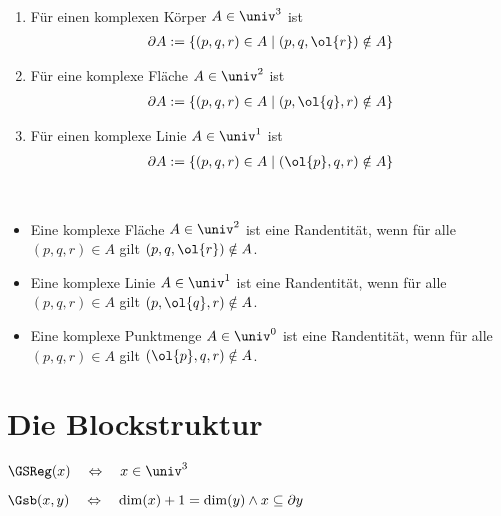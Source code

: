 \begin{dfn}\ 
    \begin{enumerate}
        \item Für einen komplexen Körper $A \in \univ^3$ ist
            \begin{align*}
                \partial A := \{(p,q,r) \in A \mid (p,q,\ol{r}) \notin A\}
            \end{align*}
        \item Für eine komplexe Fläche $A \in \univ^2$ ist
            \begin{align*}
                \partial A := \{(p,q,r) \in A \mid (p,\ol{q},r) \notin A\}
            \end{align*}
        \item Für einen komplexe Linie $A \in \univ^1$ ist
            \begin{align*}
                \partial A := \{(p,q,r) \in A \mid (\ol{p},q,r) \notin A\}
            \end{align*}
    \end{enumerate}
\end{dfn}

\begin{dfn}[Randentität]\ 
    \begin{itemize}
        \item Eine komplexe Fläche $A \in \univ^2$ ist eine Randentität, wenn für alle $(p,q,r) \in A$ gilt $(p,q,\ol{r}) \notin A$.
        \item Eine komplexe Linie $A \in \univ^1$ ist eine Randentität, wenn für alle $(p,q,r) \in A$ gilt $(p,\ol{q},r) \notin A$.
        \item Eine komplexe Punktmenge $A \in \univ^0$ ist eine Randentität, wenn für alle $(p,q,r) \in A$ gilt $(\ol{p},q,r) \notin A$.
    \end{itemize}
\end{dfn}


\section{Die Blockstruktur}

\begin{dfn}
    $\GSReg(x) \quad \Leftrightarrow \quad x \in \univ^3$ 
\end{dfn}

\begin{dfn}
    $\Gsb(x,y) \quad \Leftrightarrow \quad \dim(x)+1 = \dim(y) \land x \subseteq \partial y$
\end{dfn}

